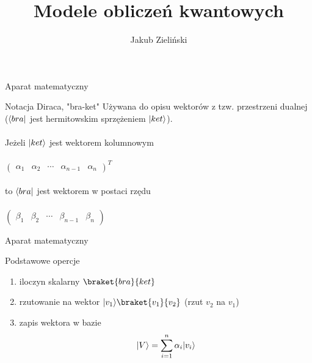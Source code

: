 \documentclass{beamer}
\title{Modele obliczeń kwantowych}
\author{Jakub Zieliński}
\institute{Wydział Elektroniki i Technik Informacyjnych\\ Politechnika Warszawska}
\date{}
\DeclarePairedDelimiter\bra{\langle}{\rvert}
\DeclarePairedDelimiter\ket{\lvert}{\rangle}
\begin{document}
	
	
	\begin{frame}
	\titlepage
	\end{frame}
	
	\begin{frame}{Aparat matematyczny}
		
		\begin{block}{Notacja Diraca, "bra-ket"}
			\vspace{0.5em}
			Używana do opisu wektorów z tzw. przestrzeni dualnej ($\bra{bra}$ jest hermitowskim sprzężeniem $\ket{ket}$).\\~\\
			Jeżeli $\ket{ket}$ jest wektorem kolumnowym \\~\\
			\centering
			$
			\begin{pmatrix}
			\alpha_{1} &\alpha_{2} & \cdots &\alpha_{n-1} &\alpha_{n} 
			\end{pmatrix}
			^{T}
			$\\~\\
			\flushleft
			to $\bra{bra}$ jest wektorem w postaci rzędu\\~\\ 
			\centering
			$
			\begin{pmatrix}
			\beta_{1} &\beta_{2} & \cdots &\beta_{n-1} &\beta_{n} 
			\end{pmatrix}
			$
			\vspace{0.5em}
		\end{block}
	\end{frame}	

	\begin{frame}{Aparat matematyczny}
		\begin{block}{Podstawowe opercje}
			\vspace{0.5em}
			\begin{enumerate}
				\item iloczyn skalarny $\braket{bra}{ket}$
				\item rzutowanie na wektor $\ket{v_{1}}\braket{v_{1}}{v_{2}}$ (rzut $v_{2}$ na $v_{1}$)
				\item zapis wektora w bazie $$\ket{V} = \sum\limits_{i=1}^n \alpha_{i}\ket{v_{i}}$$
			\end{enumerate}	
			\vspace{0.5em}
		\end{block}
	\end{frame}
	
\end{document}
